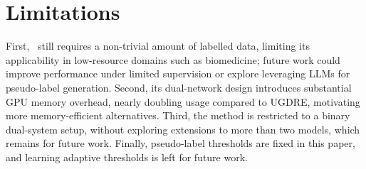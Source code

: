\newpage
\section*{Limitations}
\label{sec:limitation}
First, \model\ still requires a non-trivial amount of labelled data, limiting its applicability in low-resource domains such as biomedicine; future work could improve performance under limited supervision or explore leveraging LLMs for pseudo-label generation. Second, its dual-network design introduces substantial GPU memory overhead, nearly doubling usage compared to UGDRE, motivating more memory-efficient alternatives. Third, the method is restricted to a binary dual-system setup, without exploring extensions to more than two models, which remains for future work. Finally, pseudo-label thresholds are fixed in this paper, and learning adaptive thresholds is left for future work.